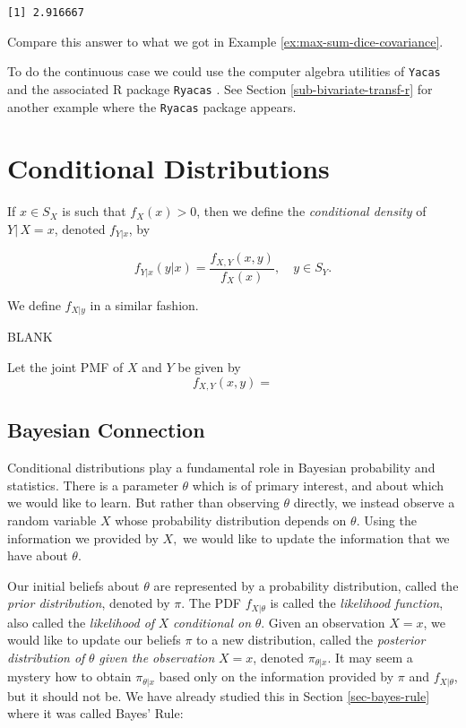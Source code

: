 \documentclass[]{book}
\numberwithin{equation}{chapter}
\numberwithin{figure}{chapter}
\theoremstyle{plain}
\theoremstyle{definition}
\theoremstyle{remark}
\theoremstyle{definition}
\theoremstyle{definition}
\theoremstyle{remark}
\let\BeginKnitrBlock\begin \let\EndKnitrBlock\end
\begin{document}
\begin{verbatim}
[1] 2.916667
\end{verbatim}

Compare this answer to what we got in Example
\ref{ex:max-sum-dice-covariance}.

To do the continuous case we could use the computer algebra utilities of
\texttt{Yacas} and the associated R package \texttt{Ryacas}
\autocite{Ryacas}. See Section \ref{sub-bivariate-transf-r} for another
example where the \texttt{Ryacas} package appears.

\section{Conditional Distributions}\label{sec-conditional-distributions}

If \(x\in S_{X}\) is such that \(f_{X}(x)>0\), then we define the
\emph{conditional density} of \(Y|\, X=x\), denoted \(f_{Y|x}\), by

\begin{equation}
f_{Y|x}(y|x)=\frac{f_{X,Y}(x,y)}{f_{X}(x)},\quad y\in S_{Y}.
\end{equation}

We define \(f_{X|y}\) in a similar fashion.

BLANK

\bigskip

\BeginKnitrBlock{example}
\protect\hypertarget{ex:unnamed-chunk-204}{}{\label{ex:unnamed-chunk-204}}Let
the joint PMF of \(X\) and \(Y\) be given by \[
f_{X,Y}(x,y) =
\]
\EndKnitrBlock{example}

\subsection{Bayesian Connection}\label{bayesian-connection}

Conditional distributions play a fundamental role in Bayesian
probability and statistics. There is a parameter \(\theta\) which is of
primary interest, and about which we would like to learn. But rather
than observing \(\theta\) directly, we instead observe a random variable
\(X\) whose probability distribution depends on \(\theta\). Using the
information we provided by \(X,\) we would like to update the
information that we have about \(\theta\).

Our initial beliefs about \(\theta\) are represented by a probability
distribution, called the \emph{prior distribution}, denoted by \(\pi\).
The PDF \(f_{X|\theta}\) is called the \emph{likelihood function}, also
called the \emph{likelihood of} \(X\) \emph{conditional on} \(\theta\).
Given an observation \(X=x\), we would like to update our beliefs
\(\pi\) to a new distribution, called the \emph{posterior distribution
of} \(\theta\) \emph{given the observation} \(X=x\), denoted
\(\pi_{\theta|x}\). It may seem a mystery how to obtain
\(\pi_{\theta|x}\) based only on the information provided by \(\pi\) and
\(f_{X|\theta}\), but it should not be. We have already studied this in
Section \ref{sec-bayes-rule} where it was called Bayes' Rule:
\end{document}
